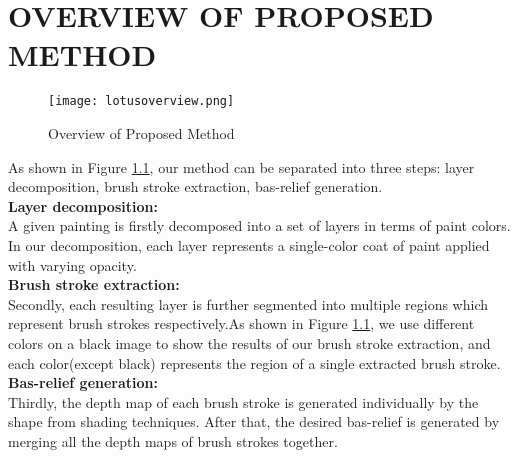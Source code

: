 \chapter{OVERVIEW OF PROPOSED METHOD} \label{overview}

\begin{figure}
\centering
\texttt{[image: lotusoverview.png]}
\caption{ Overview of Proposed Method}
\label{decom:overview}
\end{figure}
As shown in Figure \ref{decom:overview}, our method can be separated into three steps: layer decomposition, brush stroke extraction, bas-relief generation. \\
\textbf{Layer decomposition:}\\ A given painting is firstly decomposed into a set of layers in terms of paint colors. In our decomposition, each layer represents a single-color coat of paint applied with varying opacity.\\ 
\textbf{Brush stroke extraction:} \\ Secondly, each resulting layer is further segmented into multiple regions which represent brush strokes respectively.As shown in Figure \ref{decom:overview}, we use different colors on a black image to show the results of our brush stroke extraction, and each color(except black) represents the region of a single extracted brush stroke. \\
\textbf{Bas-relief generation:} \\ Thirdly, the depth map of each brush stroke is generated individually by the shape from shading techniques. After that, the desired bas-relief is generated by merging all the depth maps of brush strokes together. \\ \\ 

